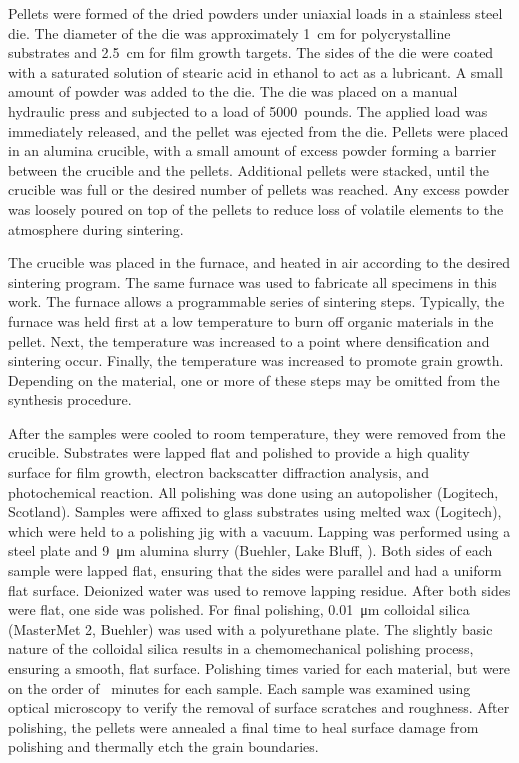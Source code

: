 Pellets were formed of the dried powders under uniaxial loads in a stainless steel die.
The diameter of the die was approximately \SI{1}{\centi\meter} for polycrystalline
substrates and \SI{2.5}{\centi\meter} for film growth targets. The sides of the die were
coated with a saturated solution of stearic acid in ethanol to act as a lubricant. A small
amount of powder was added to the die. The die was placed on a manual hydraulic press  and
subjected to a load of 5000~pounds. The applied load was immediately released, and the
pellet was ejected from the die. Pellets were placed in an alumina crucible, with a small
amount of excess powder forming a barrier between the crucible and the pellets. Additional
pellets were stacked, until the crucible was full or the desired number of pellets was
reached. Any excess powder was loosely poured on top of the pellets to reduce loss of
volatile elements to the atmosphere during sintering.

The crucible was placed in the furnace, and heated in air according to the desired
sintering program. The same furnace was used to fabricate all specimens in this work. The
furnace allows a programmable series of sintering steps. Typically, the furnace was held
first at a low temperature to burn off organic materials in the pellet. Next, the
temperature was increased to a point where densification and sintering occur. Finally, the
temperature was increased to promote grain growth. Depending on the material, one or more
of these steps may be omitted from the synthesis procedure.

After the samples were cooled to room temperature, they were removed from the crucible.
Substrates were lapped flat and polished to provide a high quality surface for film
growth, electron backscatter diffraction analysis, and photochemical reaction. All
polishing was done using an autopolisher (Logitech,  Scotland). Samples were
affixed to glass substrates using melted wax (Logitech), which were held to a polishing
jig with a vacuum. Lapping was performed using a steel plate and \SI{9}{\micro\meter}
alumina slurry (Buehler, Lake Bluff, ). Both sides of each sample were lapped
flat, ensuring that the sides were parallel and had a uniform flat surface. Deionized
water was used to remove lapping residue. After both sides were flat, one side was
polished. For final polishing,{ }\SI{0.01}{\micro\meter} colloidal silica (MasterMet 2,
Buehler) was used with a polyurethane plate. The slightly basic nature of the colloidal
silica results in a chemomechanical polishing process, ensuring a smooth, flat surface.
Polishing times varied for each material, but were on the order of ~minutes
for each sample. Each sample was examined using optical microscopy to verify the removal
of surface scratches and roughness. After polishing, the pellets were annealed a final
time to heal surface damage from polishing and thermally etch the grain boundaries. 


